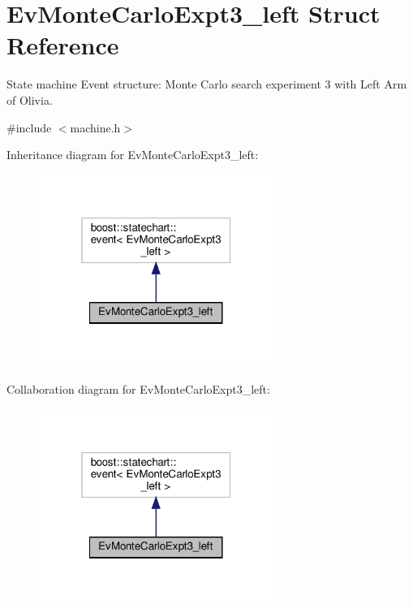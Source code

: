 \hypertarget{structEvMonteCarloExpt3__left}{}\section{Ev\+Monte\+Carlo\+Expt3\+\_\+left Struct Reference}
\label{structEvMonteCarloExpt3__left}


State machine Event structure\+: Monte Carlo search experiment 3 with Left Arm of Olivia.  




{\ttfamily \#include $<$machine.\+h$>$}



Inheritance diagram for Ev\+Monte\+Carlo\+Expt3\+\_\+left\+:
\nopagebreak
\begin{figure}[H]
\begin{center}
\leavevmode
\includegraphics[width=217pt]{structEvMonteCarloExpt3__left__inherit__graph}
\end{center}
\end{figure}


Collaboration diagram for Ev\+Monte\+Carlo\+Expt3\+\_\+left\+:
\nopagebreak
\begin{figure}[H]
\begin{center}
\leavevmode
\includegraphics[width=217pt]{structEvMonteCarloExpt3__left__coll__graph}
\end{center}
\end{figure}


